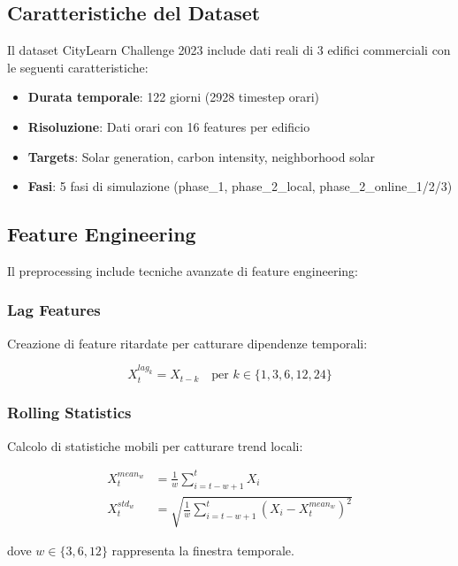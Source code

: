 \documentclass[12pt,a4paper,twoside]{report}
\begin{document}
\subsection{Caratteristiche del Dataset}

Il dataset CityLearn Challenge 2023 include dati reali di 3 edifici commerciali con le seguenti caratteristiche:

\begin{itemize}
    \item \textbf{Durata temporale}: 122 giorni (2928 timestep orari)
    \item \textbf{Risoluzione}: Dati orari con 16 features per edificio
    \item \textbf{Targets}: Solar generation, carbon intensity, neighborhood solar
    \item \textbf{Fasi}: 5 fasi di simulazione (phase\_1, phase\_2\_local, phase\_2\_online\_1/2/3)
\end{itemize}

\subsection{Feature Engineering}

Il preprocessing include tecniche avanzate di feature engineering:

\subsubsection{Lag Features}

Creazione di feature ritardate per catturare dipendenze temporali:

\begin{equation}
X_t^{lag_k} = X_{t-k} \quad \text{per } k \in \{1, 3, 6, 12, 24\}
\end{equation}

\subsubsection{Rolling Statistics}

Calcolo di statistiche mobili per catturare trend locali:

\begin{align}
X_t^{mean_w} &= \frac{1}{w} \sum_{i=t-w+1}^{t} X_i \\
X_t^{std_w} &= \sqrt{\frac{1}{w} \sum_{i=t-w+1}^{t} (X_i - X_t^{mean_w})^2}
\end{align}

dove $w \in \{3, 6, 12\}$ rappresenta la finestra temporale.
\end{document}
